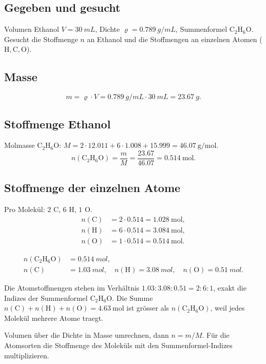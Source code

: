 
\subsection*{Gegeben und gesucht}
Volumen Ethanol $V = \qty{30}{mL}$, Dichte $\varrho =
\qty{0.789}{g/mL}$, Summenformel $\mathrm{C_2H_6O}$. Gesucht die Stoffmenge
$n$ an Ethanol und die Stoffmengen an einzelnen Atomen ($\mathrm{H,C,O}$).

\subsection*{Masse}
\begin{equation}
  m = \varrho \cdot V = \qty{0.789}{g/mL} \cdot \qty{30}{mL}
    = \qty{23.67}{g}.
\end{equation}

\subsection*{Stoffmenge Ethanol}
Molmasse $\mathrm{C_2H_6O}$:
$M = 2\cdot 12.011 + 6\cdot 1.008 + 15.999 = 46.07\ \mathrm{g/mol}$.
\begin{equation}
  n(\mathrm{C_2H_6O}) = \frac{m}{M}
    = \frac{23.67}{46.07} = 0.514\ \mathrm{mol}.
\end{equation}

\subsection*{Stoffmenge der einzelnen Atome}
Pro Molekül: $2$ C, $6$ H, $1$ O.
\begin{align*}
  n(\mathrm{C}) &= 2\cdot 0.514 = 1.028\ \mathrm{mol},\\
  n(\mathrm{H}) &= 6\cdot 0.514 = 3.084\ \mathrm{mol},\\
  n(\mathrm{O}) &= 1\cdot 0.514 = 0.514\ \mathrm{mol}.
\end{align*}

\begin{ergebnis}
\begin{align*}
  n(\mathrm{C_2H_6O}) &= \qty{0.514}{mol},\\
  n(\mathrm{C}) &= \qty{1.03}{mol},\quad
  n(\mathrm{H}) = \qty{3.08}{mol},\quad
  n(\mathrm{O}) = \qty{0.51}{mol}.
\end{align*}
\end{ergebnis}

\begin{kontrolle}
Die Atomstoffmengen stehen im Verhältnis $1.03:3.08:0.51 = 2:6:1$, exakt die
Indizes der Summenformel $\mathrm{C_2H_6O}$. Die Summe
$n(\mathrm{C})+n(\mathrm{H})+n(\mathrm{O}) = 4.63\ \mathrm{mol}$ ist grösser
als $n(\mathrm{C_2H_6O})$, weil jedes Molekül mehrere Atome traegt.
\end{kontrolle}

\begin{merksatz}
Volumen über die Dichte in Masse umrechnen, dann $n = m/M$. Für die
Atomsorten die Stoffmenge des Moleküls mit den Summenformel-Indizes
multiplizieren.
\end{merksatz}
